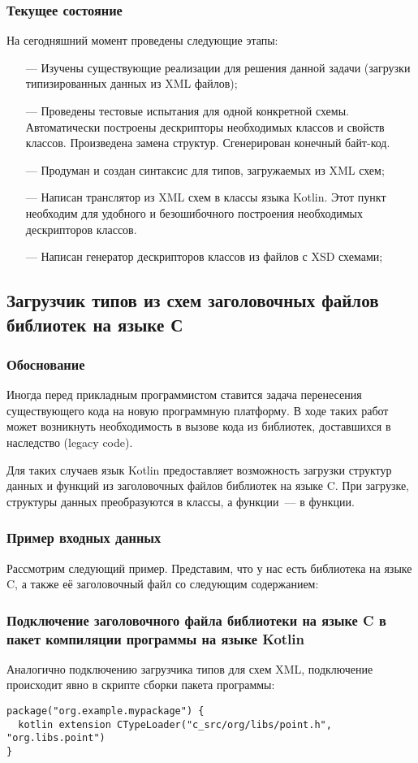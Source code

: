 \documentclass{article}
\begin{document}
\subsubsection{Текущее состояние}
На сегодняшний момент проведены следующие этапы:
\begin{itemize}
\item[---] Изучены существующие реализации для решения данной задачи (загрузки типизированных данных из XML файлов);
\item[---] Проведены тестовые испытания для одной конкретной схемы. Автоматически построены дескрипторы необходимых классов и свойств классов.
Произведена замена структур. Сгенерирован конечный байт-код.
\item[---] Продуман и создан синтаксис для типов, загружаемых из XML схем;
\item[---] Написан транслятор из XML схем в классы языка Kotlin. Этот пункт необходим для удобного и безошибочного построения необходимых дескрипторов классов.
\item[---] Написан генератор дескрипторов классов из файлов с XSD схемами;
\end{itemize}

\subsection{Загрузчик типов из схем заголовочных файлов библиотек на языке С}
\subsubsection{Обоснование}
Иногда перед прикладным программистом ставится задача перенесения существующего кода на новую программную платформу.
В ходе таких работ может возникнуть необходимость в вызове кода из библиотек, доставшихся в наследство (legacy code).

Для таких случаев язык Kotlin предоставляет возможность загрузки структур данных и функций из заголовочных файлов библиотек на языке C.
При загрузке, структуры данных преобразуются в классы, а функции~--- в функции.

\subsubsection{Пример входных данных}
Рассмотрим следующий пример. Представим, что у нас есть библиотека на языке C, а также её заголовочный файл со следующим содержанием:


\subsubsection{Подключение заголовочного файла библиотеки на языке C в пакет компиляции программы на языке Kotlin}
Аналогично подключению загрузчика типов для схем XML, подключение происходит явно в скрипте сборки пакета программы:
\begin{lstlisting}
package("org.example.mypackage") {
  kotlin extension CTypeLoader("c_src/org/libs/point.h", "org.libs.point")
}
\end{lstlisting}
\end{document}
